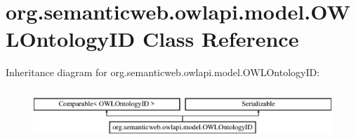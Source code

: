 \hypertarget{classorg_1_1semanticweb_1_1owlapi_1_1model_1_1_o_w_l_ontology_i_d}{\section{org.\-semanticweb.\-owlapi.\-model.\-O\-W\-L\-Ontology\-I\-D Class Reference}
\label{classorg_1_1semanticweb_1_1owlapi_1_1model_1_1_o_w_l_ontology_i_d}
}
Inheritance diagram for org.\-semanticweb.\-owlapi.\-model.\-O\-W\-L\-Ontology\-I\-D\-:\begin{figure}[H]
\begin{center}
\leavevmode
\includegraphics[height=1.951219cm]{classorg_1_1semanticweb_1_1owlapi_1_1model_1_1_o_w_l_ontology_i_d}
\end{center}
\end{figure}
